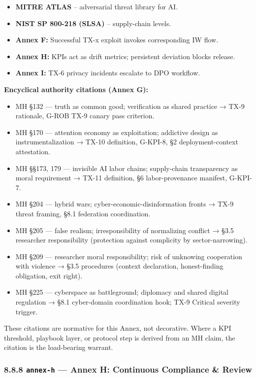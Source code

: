 \documentclass[11pt]{article}
\begin{document}
\begin{itemize}\setlength\itemsep{0pt}
\item \textbf{MITRE ATLAS} – adversarial threat library for AI.
\item \textbf{NIST SP 800-218 (SLSA)} – supply-chain levels.
\item \textbf{Annex F:} Successful TX-x exploit invokes corresponding IW flow.
\item \textbf{Annex H:} KPIs act as drift metrics; persistent deviation blocks release.
\item \textbf{Annex I:} TX-6 privacy incidents escalate to DPO workflow.
\end{itemize}


\textbf{Encyclical authority citations (Annex G):}


\begin{itemize}\setlength\itemsep{0pt}
\item MH §132 — truth as common good; verification as shared practice → TX-9 rationale, G-ROB TX-9 canary pass criterion.
\item MH §170 — attention economy as exploitation; addictive design as instrumentalization → TX-10 definition, G-KPI-8, §2 deployment-context attestation.
\item MH §§173, 179 — invisible AI labor chains; supply-chain transparency as moral requirement → TX-11 definition, §6 labor-provenance manifest, G-KPI-7.
\item MH §204 — hybrid wars; cyber-economic-disinformation fronts → TX-9 threat framing, §8.1 federation coordination.
\item MH §205 — false realism; irresponsibility of normalizing conflict → §3.5 researcher responsibility (protection against complicity by sector-narrowing).
\item MH §209 — researcher moral responsibility; risk of unknowing cooperation with violence → §3.5 procedures (context declaration, honest-finding obligation, exit right).
\item MH §225 — cyberspace as battleground; diplomacy and shared digital regulation → §8.1 cyber-domain coordination hook; TX-9 Critical severity trigger.
\end{itemize}


These citations are normative for this Annex, not decorative. Where a KPI threshold, playbook layer, or protocol step is derived from an MH claim, the citation is the load-bearing warrant.


\subsubsection*{8.8.8 \texttt{annex-h} — Annex H: Continuous Compliance \& Review}
\end{document}
